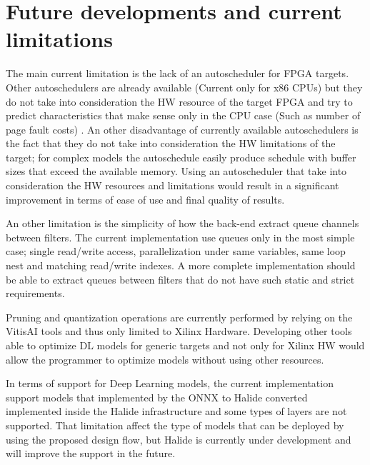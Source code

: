\documentclass[../main.tex]{subfiles}
\begin{document}
\section{Future developments and current limitations}

The main current limitation is the lack of an autoscheduler for FPGA targets. 
Other autoschedulers are already available (Current only for x86 CPUs) but they do not take into consideration the HW resource of the target FPGA and try to predict characteristics that make sense only in the CPU case (Such as number of page fault costs) \cite{halideAutoscheduler}.
An other disadvantage of currently available autoschedulers is the fact that they do not take into consideration the HW limitations of the target; for complex models the autoschedule easily produce schedule with buffer sizes that exceed the available memory.
Using an autoscheduler that take into consideration the HW resources and limitations would result in a significant improvement in terms of ease of use and final quality of results.

An other limitation is the simplicity of how the back-end extract queue channels between filters.
The current implementation use queues only in the most simple case; single read/write access, parallelization under same variables, same loop nest and matching read/write indexes.
A more complete implementation should be able to extract queues between filters that do not have such static and strict requirements.

Pruning and quantization operations are currently performed by relying on the VitisAI tools and thus only limited to Xilinx Hardware.
Developing other tools able to optimize DL models for generic targets and not only for Xilinx HW would allow the programmer to optimize models without using other resources.

In terms of support for Deep Learning models, the current implementation support models that implemented by the ONNX to Halide converted implemented inside the Halide infrastructure and some types of layers are not supported.
That limitation affect the type of models that can be deployed by using the proposed design flow, but Halide is currently under development and will improve the support in the future.
\end{document}
